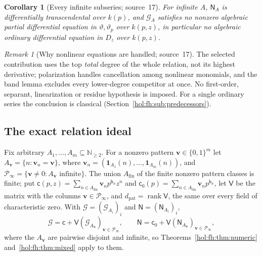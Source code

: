 \documentclass[11pt]{article}
\numberwithin{equation}{section}
\newtheorem{corollary}[theorem]{Corollary}
\theoremstyle{definition}
\theoremstyle{remark}
\newtheorem{remark}[theorem]{Remark}
\newcommand{\N}{\mathbb N}
\begin{document}
\begin{corollary}[Every infinite subseries; source~17]\label{hol:fh:cor:every}
For infinite $A$, $\mathsf N_A$ is differentially transcendental over $k(p)$,
and $\mathcal G_A$ satisfies no nonzero algebraic partial differential equation
in $\vartheta,\vartheta_p$ over $k(p,z)$, in particular no algebraic ordinary
differential equation in $D_z$ over $k(p,z)$.
\end{corollary}

\begin{remark}[Why nonlinear equations are handled; source~17]
\label{hol:fh:rem:nonlinear}
The selected contribution uses the top \emph{total} degree of the whole
relation, not its highest derivative; polarization handles cancellation among
nonlinear monomials, and the band lemma excludes every lower-degree competitor
at once. No first-order, separant, linearization or residue hypothesis is
imposed. For a single ordinary series the conclusion is classical
(Section~\ref{hol:fh:sub:predecessors}).
\end{remark}

\subsection{The exact relation ideal}\label{hol:fh:sub:relations}

Fix arbitrary $A_1,\ldots,A_m\subseteq\N_{\ge2}$. For a nonzero pattern
$\mathbf v\in\{0,1\}^m$ let $A_{\mathbf v}=\{n:\mathbf v_n=\mathbf v\}$, where
$\mathbf v_n=(\mathbf 1_{A_1}(n),\ldots,\mathbf 1_{A_m}(n))$, and
$\mathcal P_\infty=\{\mathbf v\ne0:A_{\mathbf v}\text{ infinite}\}$. The union
$A_{\mathrm{fin}}$ of the finite nonzero pattern classes is finite; put
$\mathsf c(p,z)=\sum_{n\in A_{\mathrm{fin}}}\mathbf v_np^{\mathsf b_n}z^n$ and
$\mathsf c_0(p)=\sum_{n\in A_{\mathrm{fin}}}\mathbf v_np^{\mathsf b_n}$, let
$\mathsf V$ be the matrix with the columns $\mathbf v\in\mathcal P_\infty$, and
$d_{\mathrm{pat}}=\operatorname{rank}\mathsf V$, the same over every field of
characteristic zero. With $\boldsymbol{\mathcal G}=(\mathcal G_{A_i})_i$ and
$\boldsymbol{\mathsf N}=(\mathsf N_{A_i})_i$,
\begin{equation}\label{hol:fh:eq:patterns}
 \boldsymbol{\mathcal G}=\mathsf c+\mathsf V(\mathcal G_{A_{\mathbf v}})_{\mathbf
 v\in\mathcal P_\infty},\qquad
 \boldsymbol{\mathsf N}=\mathsf c_0+\mathsf V(\mathsf N_{A_{\mathbf v}})_{\mathbf
 v\in\mathcal P_\infty},
\end{equation}
where the $A_{\mathbf v}$ are pairwise disjoint and infinite, so
Theorems~\ref{hol:fh:thm:numeric} and~\ref{hol:fh:thm:mixed} apply to them.
\end{document}
